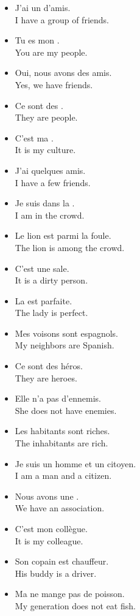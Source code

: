 \begin{itemize}
  \item  J'ai un  d'amis. \\ I have a group of friends.
	\item  Tu es mon . \\ You are my people.
	\item  Oui, nous avons des amis. \\ Yes, we have friends.
	\item  Ce sont des . \\ They are people.
	\item  C'est ma . \\ It is my culture.
	\item  J'ai quelques amis. \\ I have a few friends.
	\item  Je suis dans la . \\ I am in the crowd.
	\item  Le lion est parmi la foule. \\ The lion is among the crowd.
	\item  C'est une  sale. \\ It is a dirty person.
	\item  La  est parfaite. \\ The lady is perfect.
	\item  Mes voisons sont espagnols. \\ My neighbors are Spanish.
	\item  Ce sont des h{\'e}ros. \\ They are heroes.
	\item  Elle n'a pas d'ennemis. \\ She does not have enemies.
	\item  Les habitants sont riches. \\ The inhabitants are rich.
	\item  Je suis un homme et un citoyen. \\ I am a man and a citizen.
	\item  Nous avons une . \\ We have an association.
	\item  C'est mon coll{\`e}gue. \\ It is my colleague.
	\item  Son copain est chauffeur. \\ His buddy is a driver.
	\item  Ma  ne mange pas de poisson. \\ My generation does not eat fish.

\end{itemize}
